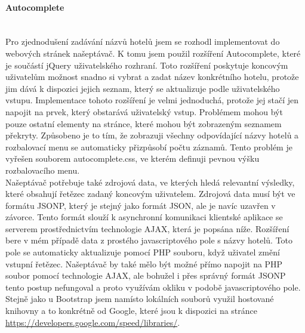 \documentclass[czech,BP]{thesiskiv}
\begin{document}
\paragraph{Autocomplete}
\mbox{}\\
Pro zjednodušení zadávání názvů hotelů jsem se rozhodl implementovat do webových stránek našeptávač. K tomu jsem použil rozšíření Autocomplete, které je součástí jQuery uživatelského rozhraní. Toto rozšíření poskytuje koncovým uživatelům možnost snadno si vybrat a zadat název konkrétního hotelu, protože jim dává k dispozici jejich seznam, který se aktualizuje podle uživatelského vstupu. Implementace tohoto rozšíření je velmi jednoduchá, protože jej stačí jen napojit na prvek, který obstarává uživatelský vstup. Problémem mohou být pouze ostatní elementy na stránce, které mohou být zobrazeným seznamem překryty. Způsobeno je to tím, že zobrazuji všechny odpovídající názvy hotelů a rozbalovací menu se automaticky přizpůsobí počtu záznamů. Tento problém je vyřešen souborem autocomplete.css, ve kterém definuji pevnou výšku rozbalovacího menu.
\\
Našeptávač potřebuje také zdrojová data, ve kterých hledá relevantní výsledky, které obsahují řetězec zadaný koncovým uživatelem. Zdrojová data musí být ve formátu JSONP, který je stejný jako formát JSON, ale je navíc uzavřen v závorce. Tento formát slouží k asynchronní komunikaci klientské aplikace se serverem prostřednictvím technologie AJAX, která je popsána níže. Rozšíření bere v mém případě data z prostého javascriptového pole s názvy hotelů. Toto pole se automaticky aktualizuje pomocí PHP souboru, když uživatel změní vstupní řetězec. Našeptávač by také mělo být možné přímo napojit na PHP soubor pomocí technologie AJAX, ale bohužel i přes správný formát JSONP tento postup nefungoval a proto využívám okliku v podobě javascriptového pole.
\\
Stejně jako u Bootstrap jsem namísto lokálních souborů využil hostované knihovny a to konkrétně od Google, které jsou k dispozici na stránce\\ \url{https://developers.google.com/speed/libraries/}.
\end{document}
